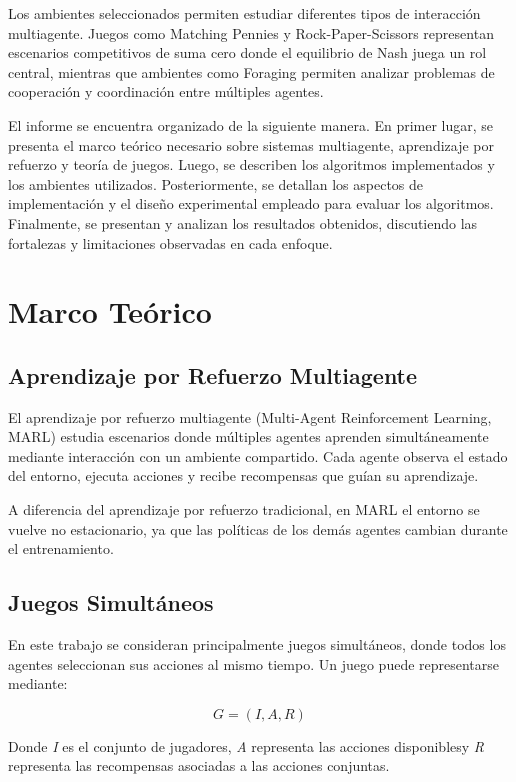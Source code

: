 \documentclass[letterpaper,12pt]{article} %
\begin{document}
Los ambientes seleccionados permiten estudiar diferentes tipos de interacción multiagente. Juegos como Matching Pennies y Rock-Paper-Scissors representan escenarios competitivos de suma cero donde el equilibrio de Nash juega un rol central, mientras que ambientes como Foraging permiten analizar problemas de cooperación y coordinación entre múltiples agentes.

El informe se encuentra organizado de la siguiente manera. En primer lugar, se presenta el marco teórico necesario sobre sistemas multiagente, aprendizaje por refuerzo y teoría de juegos. Luego, se describen los algoritmos implementados y los ambientes utilizados. Posteriormente, se detallan los aspectos de implementación y el diseño experimental empleado para evaluar los algoritmos. Finalmente, se presentan y analizan los resultados obtenidos, discutiendo las fortalezas y limitaciones observadas en cada enfoque.

\clearpage
\section{Marco Teórico}

\subsection{Aprendizaje por Refuerzo Multiagente}

El aprendizaje por refuerzo multiagente (Multi-Agent Reinforcement Learning, MARL) estudia escenarios donde múltiples agentes aprenden simultáneamente mediante interacción con un ambiente compartido. Cada agente observa el estado del entorno, ejecuta acciones y recibe recompensas que guían su aprendizaje.

A diferencia del aprendizaje por refuerzo tradicional, en MARL el entorno se vuelve no estacionario, ya que las políticas de los demás agentes cambian durante el entrenamiento.

\subsection{Juegos Simultáneos}

En este trabajo se consideran principalmente juegos simultáneos, donde todos los agentes seleccionan sus acciones al mismo tiempo. Un juego puede representarse mediante:

\[
G = (I, A, R)
\]

Donde \textit{I}  es el conjunto de jugadores, \textit{A} representa las acciones disponiblesy \textit{R} representa las recompensas asociadas a las acciones conjuntas.
\end{document}
